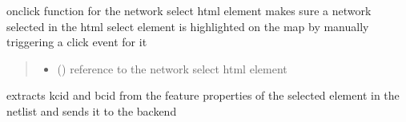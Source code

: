 \documentclass[letterpaper,10pt,english]{sphinxmanual}
\begin{document}
\begin{fulllineitems}
\label{\detokenize{docs_gui/js_api/postcode_editor/display_postcode:highlightSelectedPreviewLayer}}
\pysigstartsignatures
{}
\pysigstopsignatures
\sphinxAtStartPar
onclick function for the network select html element
makes sure a network selected in the html select element is highlighted on the map by manually triggering a click event for it
\begin{quote}\begin{description}
\begin{itemize}
\item {} 
\sphinxAtStartPar
{} () \textendash{} reference to the network select html element

\end{itemize}

\end{description}\end{quote}

\end{fulllineitems}


\begin{fulllineitems}
\label{\detokenize{docs_gui/js_api/postcode_editor/display_postcode:sendBackSelectedNetworkKcidBcid}}
\pysigstartsignatures
{}
\pysigstopsignatures
\sphinxAtStartPar
extracts kcid and bcid from the feature properties of the selected element in the netlist and sends it to the backend

\end{fulllineitems}

\end{document}
